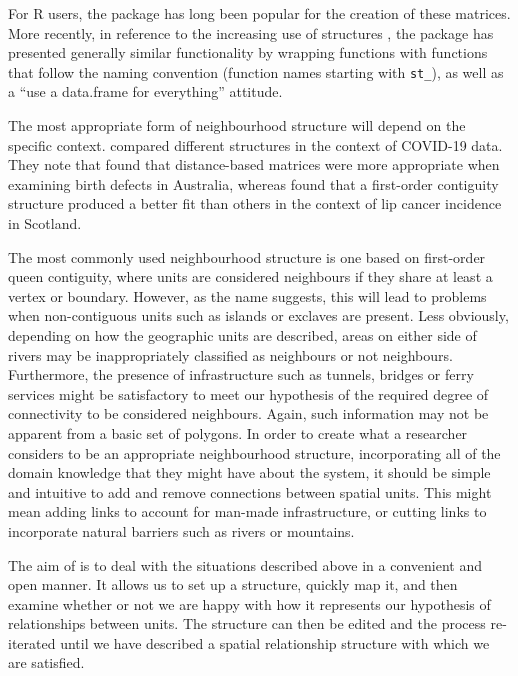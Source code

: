 For R users, the  package \citep{spdep} has long been popular for the
creation of these matrices. More recently, in reference to the increasing use of  structures \citep{sf}, the  package \citep{sfdep} has presented generally similar functionality by wrapping  functions with functions that follow the  naming convention (function names starting with \texttt{st\_}), as well as a ``use a data.frame for everything'' attitude.

The most appropriate form of neighbourhood structure will depend on the specific context. \citet{BrizRedn2021} compared different structures in the context of COVID-19 data. They note that \citet{Earnest2007} found that distance-based matrices were more appropriate when examining birth defects in Australia, whereas \citet{Duncan2017} found that a first-order contiguity structure produced a better fit than others in the context of lip cancer incidence in Scotland.

The most commonly used neighbourhood structure is one based on first-order queen contiguity, where units are considered neighbours if they
share at least a vertex or boundary. However, as the name suggests, this
will lead to problems when non-contiguous units such as islands or
exclaves are present. Less obviously, depending on how the geographic
units are described, areas on either side of rivers may be
inappropriately classified as neighbours or not neighbours. Furthermore,
the presence of infrastructure such as tunnels, bridges or ferry
services might be satisfactory to meet our hypothesis of the required
degree of connectivity to be considered neighbours. Again, such information may not be apparent from a basic set of polygons. In order to create what a researcher considers to be an appropriate neighbourhood structure, incorporating all of the domain knowledge that they might have about the system, it should be simple and intuitive to add and remove connections between spatial units. This might mean adding links to account for man-made infrastructure, or cutting links to incorporate natural barriers such as rivers or mountains.

The aim of  \citep{sfislands} is to deal with the situations described above in a
convenient and open manner. It allows us to set up a structure, quickly
map it, and then examine whether or not we are happy with how it represents our hypothesis of relationships between units. The structure can then be edited and the process re-iterated until we have described a
spatial relationship structure with which we are satisfied.

